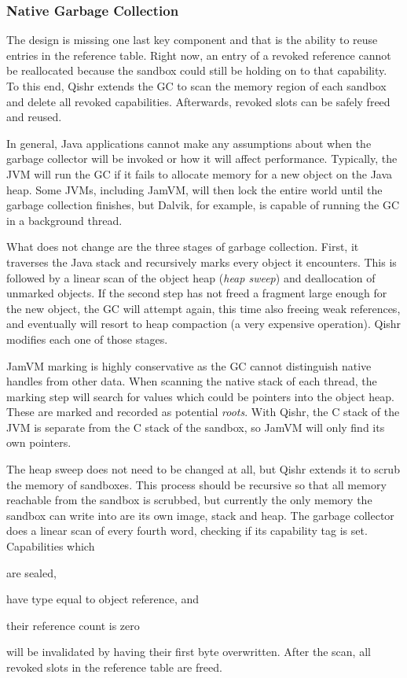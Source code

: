 \documentclass[a4paper,12pt,twoside,openright]{report}
\begin{document}
\subsubsection{Native Garbage Collection}

The design is missing one last key component and that is the ability to reuse entries in the reference table. Right now, an entry of a revoked reference cannot be reallocated because the sandbox could still be holding on to that capability. To this end, Qishr extends the GC to scan the memory region of each sandbox and delete all revoked capabilities. Afterwards, revoked slots can be safely freed and reused.

In general, Java applications cannot make any assumptions about when the garbage collector will be invoked or how it will affect performance. Typically, the JVM will run the GC if it fails to allocate memory for a new object on the Java heap. Some JVMs, including JamVM, will then lock the entire world until the garbage collection finishes, but Dalvik, for example, is capable of running the GC in a background thread. 

What does not change are the three stages of garbage collection. First, it traverses the Java stack and recursively marks every object it encounters. This is followed by a linear scan of the object heap (\emph{heap sweep}) and deallocation of unmarked objects. If the second step has not freed a fragment large enough for the new object, the GC will attempt again, this time also freeing weak references, and eventually will resort to heap compaction (a very expensive operation). Qishr modifies each one of those stages.

JamVM marking is highly conservative as the GC cannot distinguish native handles from other data. When scanning the native stack of each thread, the marking step will search for values which could be pointers into the object heap. These are marked and recorded as potential \emph{roots}. With Qishr, the C stack of the JVM is separate from the C stack of the sandbox, so JamVM will only find its own pointers.

The heap sweep does not need to be changed at all, but Qishr extends it to scrub the memory of sandboxes. This process should be recursive so that all memory reachable from the sandbox is scrubbed, but currently the only memory the sandbox can write into are its own image, stack and heap. The garbage collector does a linear scan of every fourth word, checking if its capability tag is set. Capabilities which 
\begin{inparaenum}
\item are sealed,
\item have type equal to object reference, and
\item their reference count is zero
\end{inparaenum}
will be invalidated by having their first byte overwritten. After the scan, all revoked slots in the reference table are freed.
\end{document}
